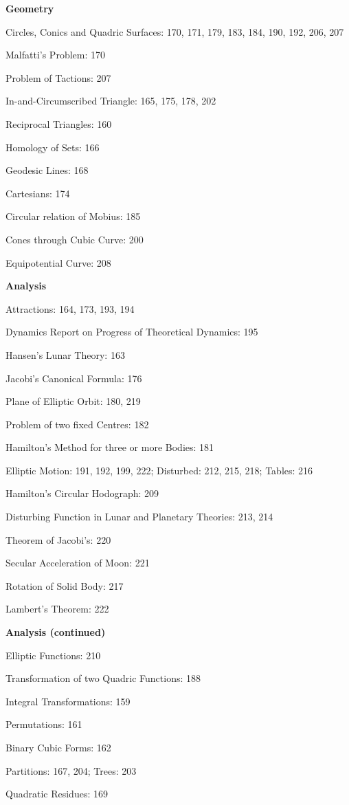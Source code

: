 \documentclass[11pt,a4paper]{book}
\begin{document}
\textbf{Geometry}

Circles, Conics and Quadric Surfaces: 170, 171, 179, 183, 184, 190, 192, 206, 207

Malfatti's Problem: 170

Problem of Tactions: 207

In-and-Circumscribed Triangle: 165, 175, 178, 202

Reciprocal Triangles: 160

Homology of Sets: 166

Geodesic Lines: 168

Cartesians: 174

Circular relation of Mobius: 185

Cones through Cubic Curve: 200

Equipotential Curve: 208

\bigskip
\textbf{Analysis}

Attractions: 164, 173, 193, 194

Dynamics Report on Progress of Theoretical Dynamics: 195

Hansen's Lunar Theory: 163

Jacobi's Canonical Formula: 176

Plane of Elliptic Orbit: 180, 219

Problem of two fixed Centres: 182

Hamilton's Method for three or more Bodies: 181

Elliptic Motion: 191, 192, 199, 222; Disturbed: 212, 215, 218; Tables: 216

Hamilton's Circular Hodograph: 209

Disturbing Function in Lunar and Planetary Theories: 213, 214

Theorem of Jacobi's: 220

Secular Acceleration of Moon: 221

Rotation of Solid Body: 217

Lambert's Theorem: 222

\bigskip
\textbf{Analysis (continued)}

Elliptic Functions: 210

Transformation of two Quadric Functions: 188

Integral Transformations: 159

Permutations: 161

Binary Cubic Forms: 162

Partitions: 167, 204; Trees: 203

Quadratic Residues: 169
\end{document}
